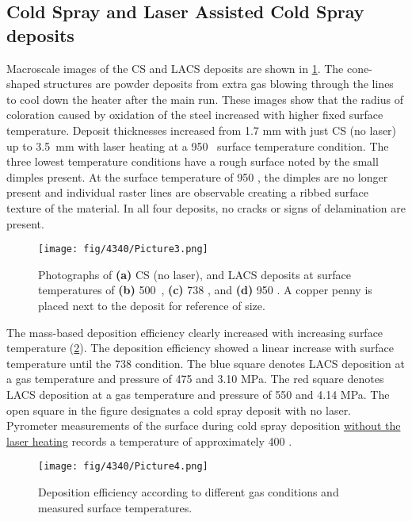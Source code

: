 \subsection*{Cold Spray and Laser Assisted Cold Spray deposits}

Macroscale images of the CS and LACS deposits are shown in \ref{fig:43403}. The cone-shaped structures are powder deposits from extra gas blowing through the lines to cool down the heater after the main run. These images show that the radius of coloration caused by oxidation of the steel increased with higher fixed surface temperature. Deposit thicknesses increased from 1.7 mm with just CS (no laser) up to 3.5 mm with laser heating at a 950 \celsius{} surface temperature condition. The three lowest temperature conditions have a rough surface noted by the small dimples present. At the surface temperature of 950 \celsius{}, the dimples are no longer present and individual raster lines are observable creating a ribbed surface texture of the material. In all four deposits, no cracks or signs of delamination are present.



\begin{figure}
	\centering
	\texttt{[image: fig/4340/Picture3.png]}
	\caption[Photographs of LACS deposits of 4340 steel.]{Photographs of \textbf{(a)} CS (no laser), and LACS deposits at surface temperatures of \textbf{(b)} 500 \celsius{}, \textbf{(c)} 738 \celsius{}, and \textbf{(d)} 950 \celsius{}. A copper penny is placed next to the deposit for reference of size.}
	\label{fig:43403}
\end{figure}



The mass-based deposition efficiency clearly increased with increasing surface temperature (\ref{fig:43404}). The deposition efficiency showed a linear increase with surface temperature until the 738 \celsius{} condition. The blue square denotes LACS deposition at a gas temperature and pressure of 475 \celsius{} and 3.10 MPa. The red square denotes LACS deposition at a gas temperature and pressure of 550 \celsius{} and 4.14 MPa. The open square in the figure designates a cold spray deposit with no laser. Pyrometer measurements of the surface during cold spray deposition \underline{without the laser heating} records a temperature of approximately 400 \celsius{}.

\begin{figure}
	\centering
	\texttt{[image: fig/4340/Picture4.png]}
	\caption{Deposition efficiency according to different gas conditions and measured surface temperatures.}
	\label{fig:43404}
\end{figure}


